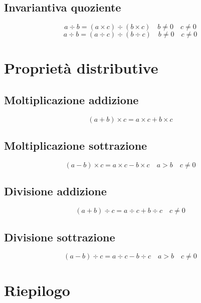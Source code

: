 \subsection{Invariantiva quoziente}
\begin{equation}
a\div b=(a\times c)\div (b\times c)\quad b\neq 0\quad c \neq 0
\end{equation}
\begin{equation}
a\div b=(a\div c)\div (b\div c)\quad b\neq 0\quad c \neq 0
\end{equation}
\section{Proprietà distributive}
\subsection{Moltiplicazione addizione}
\begin{equation}
(a+b)\times c=a\times c+b\times c
\end{equation}
\subsection{Moltiplicazione sottrazione}
\begin{equation}
(a-b)\times c=a\times c-b\times c\quad a>b\quad c\neq 0
\end{equation}
\subsection{Divisione addizione}
\begin{equation}
(a+b)\div c=a\div c+b\div c\quad c\neq 0
\end{equation}
\subsection{Divisione sottrazione}
\begin{equation}
(a-b)\div c=a\div c-b\div c\quad a>b\quad c\neq 0
\end{equation}
\section{Riepilogo}

